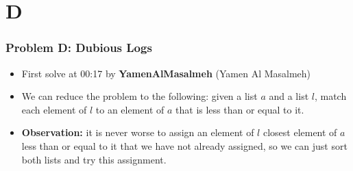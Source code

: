\section{D}%
\label{sec:d}

\begin{frame}
  \frametitle{Problem D: Dubious Logs}

  \begin{itemize}
    \item First solve at 00:17 by \textbf{YamenAlMasalmeh} (Yamen Al Masalmeh)
    \item We can reduce the problem to the following: given a list $a$ and a list $l$,
      match each element of $l$ to an element of $a$ that is less than or equal to it.
    \item \textbf{Observation:} it is never worse to assign an element of $l$ closest
      element of $a$ less than or equal to it that we have not already assigned, so we
      can just sort both lists and try this assignment.
  \end{itemize}
\end{frame}
